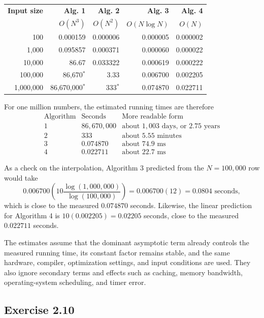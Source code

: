 \documentclass[12pt,a4paper]{article}
\begin{document}
\begin{center}
\small
\begin{tabular}{r|r|r|r|r}
\textbf{Input size} & \textbf{Alg. 1} & \textbf{Alg. 2} &
\textbf{Alg. 3} & \textbf{Alg. 4} \\
 & $O(N^3)$ & $O(N^2)$ & $O(N\log N)$ & $O(N)$ \\
\hline
100       & 0.000159 & 0.000006 & 0.000005 & 0.000002 \\
1{,}000   & 0.095857 & 0.000371 & 0.000060 & 0.000022 \\
10{,}000  & 86.67    & 0.033322 & 0.000619 & 0.000222 \\
100{,}000 & 86{,}670$^{*}$ & 3.33 & 0.006700 & 0.002205 \\
1{,}000{,}000 & 86{,}670{,}000$^{*}$ & 333$^{*}$ &
0.074870 & 0.022711
\end{tabular}
\end{center}

For one million numbers, the estimated running times are therefore
\[
\begin{array}{c|c|c}
\text{Algorithm} & \text{Seconds} & \text{More readable form} \\
\hline
1 & 86{,}670{,}000 & \text{about }1{,}003\text{ days, or }2.75\text{ years} \\
2 & 333 & \text{about }5.55\text{ minutes} \\
3 & 0.074870 & \text{about }74.9\text{ ms} \\
4 & 0.022711 & \text{about }22.7\text{ ms}
\end{array}
\]

As a check on the interpolation, Algorithm 3 predicted from the
$N=100{,}000$ row would take
\[
0.006700\left(10\frac{\log(1{,}000{,}000)}
                         {\log(100{,}000)}\right)
=0.006700(12)
=0.0804\text{ seconds},
\]
which is close to the measured $0.074870$ seconds. Likewise, the linear
prediction for Algorithm 4 is $10(0.002205)=0.02205$ seconds, close to
the measured $0.022711$ seconds.

The estimates assume that the dominant asymptotic term already controls
the measured running time, its constant factor remains stable, and the
same hardware, compiler, optimization settings, and input conditions are
used. They also ignore secondary terms and effects such as caching,
memory bandwidth, operating-system scheduling, and timer error.

\subsection*{\color{sectionnavy}Exercise 2.10}
\end{document}
